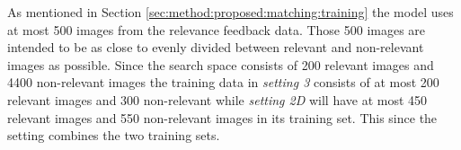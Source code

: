 As mentioned in Section \ref{sec:method:proposed:matching:training} the model uses at most 500 images  from the relevance feedback data. Those 500 images are intended to be as close to evenly divided between relevant and non-relevant images as possible. Since the search space consists of 200 relevant images and 4400 non-relevant images the training data in \emph{setting 3} consists of at most 200 relevant images and 300 non-relevant while \emph{setting 2D} will have at most 450 relevant images and 550 non-relevant images in its training set. 
This since the setting combines the two training sets.